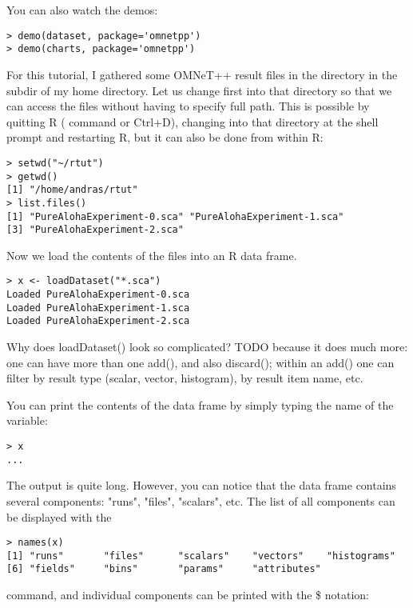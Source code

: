 You can also watch the demos:

\begin{verbatim}
> demo(dataset, package='omnetpp')
> demo(charts, package='omnetpp')
\end{verbatim}

For this tutorial, I gathered some OMNeT++ result files in the directory 
in the  subdir of my home directory. Let us change first into that 
directory so that we can access the files without having to specify 
full path. This is possible by quitting R ( command or Ctrl+D), 
changing into that directory at the shell prompt and restarting R, 
but it can also be done from within R:

\begin{verbatim}
> setwd("~/rtut")
> getwd()
[1] "/home/andras/rtut"
> list.files()
[1] "PureAlohaExperiment-0.sca" "PureAlohaExperiment-1.sca"
[3] "PureAlohaExperiment-2.sca"
\end{verbatim}

Now we load the contents of the files into an R data frame.

\begin{verbatim}
> x <- loadDataset("*.sca")
Loaded PureAlohaExperiment-0.sca
Loaded PureAlohaExperiment-1.sca
Loaded PureAlohaExperiment-2.sca
\end{verbatim}

Why does loadDataset() look so complicated?  TODO because it does much more: one can have more than one add(), and also discard(); within an add() one can filter by result type (scalar, vector, histogram), by result item name, etc.

You can print the contents of the data frame by simply typing the name of the variable:

\begin{verbatim}
> x
...
\end{verbatim}

The output is quite long. However, you can notice that the data frame contains several components:
"runs", "files", "scalars", etc. The list of all components can be displayed with the

\begin{verbatim}
> names(x)
[1] "runs"       "files"      "scalars"    "vectors"    "histograms"
[6] "fields"     "bins"       "params"     "attributes"
\end{verbatim}

command, and individual components can be printed with the \$ notation:

